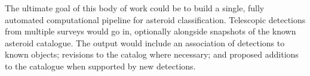 The ultimate goal of this body of work could be to build a single, fully automated computational pipeline for asteroid classification.
Telescopic detections from multiple surveys would go in, optionally alongside snapshots of the known asteroid catalogue.
The output would include an association of detections to known objects; revisions to the catalog where necessary; 
and proposed additions to the catalogue when supported by new detections.